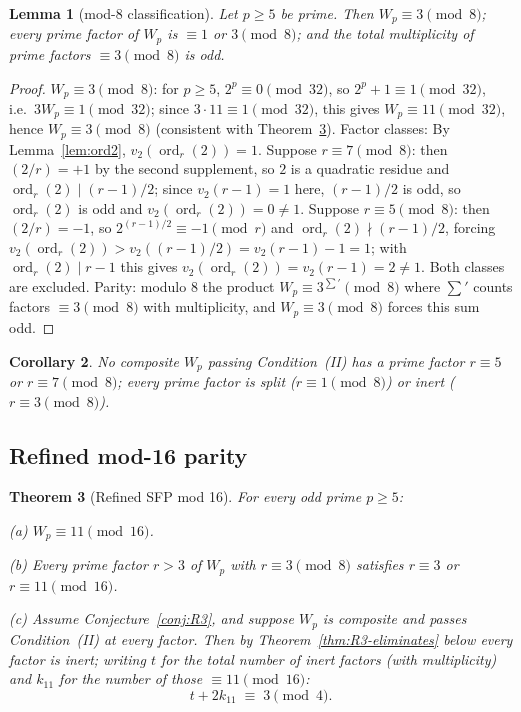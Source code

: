 \documentclass[11pt]{amsart}
\theoremstyle{plain}
\newtheorem{theorem}{Theorem}[section]
\newtheorem{lemma}[theorem]{Lemma}
\newtheorem{corollary}[theorem]{Corollary}
\theoremstyle{definition}
\theoremstyle{remark}
\numberwithin{equation}{section}
\newcommand{\ord}{\operatorname{ord}}
\begin{document}
\begin{lemma}[mod-8 classification]\label{lem:mod8}
Let $p \geq 5$ be prime. Then $W_p \equiv 3 \pmod 8$; every prime factor of $W_p$ is $\equiv 1$ or $3 \pmod 8$; and the total multiplicity of prime factors $\equiv 3 \pmod 8$ is odd.
\end{lemma}

\begin{proof}
$W_p \equiv 3 \pmod 8$: for $p \geq 5$, $2^p \equiv 0 \pmod{32}$, so $2^p + 1 \equiv 1 \pmod{32}$, i.e.\ $3 W_p \equiv 1 \pmod{32}$; since $3 \cdot 11 \equiv 1 \pmod{32}$, this gives $W_p \equiv 11 \pmod{32}$, hence $W_p \equiv 3 \pmod 8$ (consistent with Theorem~\ref{thm:mod16}). Factor classes: By Lemma~\ref{lem:ord2}, $v_2(\ord_r(2)) = 1$. Suppose $r \equiv 7 \pmod 8$: then $(2/r) = +1$ by the second supplement, so $2$ is a quadratic residue and $\ord_r(2) \mid (r-1)/2$; since $v_2(r-1) = 1$ here, $(r-1)/2$ is odd, so $\ord_r(2)$ is odd and $v_2(\ord_r(2)) = 0 \neq 1$. Suppose $r \equiv 5 \pmod 8$: then $(2/r) = -1$, so $2^{(r-1)/2} \equiv -1 \pmod r$ and $\ord_r(2) \nmid (r-1)/2$, forcing $v_2(\ord_r(2)) > v_2((r-1)/2) = v_2(r-1) - 1 = 1$; with $\ord_r(2) \mid r-1$ this gives $v_2(\ord_r(2)) = v_2(r-1) = 2 \neq 1$. Both classes are excluded. Parity: modulo 8 the product $W_p \equiv 3^{\sum'} \pmod 8$ where $\sum'$ counts factors $\equiv 3 \pmod 8$ with multiplicity, and $W_p \equiv 3 \pmod 8$ forces this sum odd.
\end{proof}

\begin{corollary}\label{cor:no57}
No composite $W_p$ passing Condition~(II) has a prime factor $r \equiv 5$ or $r \equiv 7 \pmod 8$; every prime factor is split ($r \equiv 1 \pmod 8$) or inert ($r \equiv 3 \pmod 8$).
\end{corollary}

\subsection{Refined mod-16 parity}

\begin{theorem}[Refined SFP mod 16]\label{thm:mod16}
For every odd prime $p \geq 5$:

(a) $W_p \equiv 11 \pmod{16}$.

(b) Every prime factor $r > 3$ of $W_p$ with $r \equiv 3 \pmod 8$ satisfies $r \equiv 3$ or $r \equiv 11 \pmod{16}$.

(c) Assume Conjecture~\ref{conj:R3}, and suppose $W_p$ is composite and passes Condition~(II) at every factor. Then by Theorem~\ref{thm:R3-eliminates} below every factor is inert; writing $t$ for the total number of inert factors (with multiplicity) and $k_{11}$ for the number of those $\equiv 11 \pmod{16}$:
\[
  t + 2 k_{11} \;\equiv\; 3 \pmod 4.
\]
\end{theorem}
\end{document}
